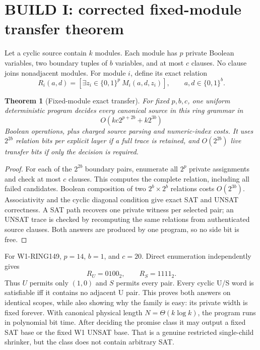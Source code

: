 \documentclass[11pt]{article}
\newtheorem{theorem}{Theorem}
\begin{document}
\section{BUILD I: corrected fixed-module transfer theorem}
Let a cyclic source contain $k$ modules. Each module has $p$ private Boolean
variables, two boundary tuples of $b$ variables, and at most $c$ clauses. No
clause joins nonadjacent modules. For module $i$, define its exact relation
\[
 R_i(a,d)=
 [\exists z_i\in\{0,1\}^p\ M_i(a,d,z_i)],
 \qquad a,d\in\{0,1\}^b.
\]
\begin{theorem}[Fixed-module exact transfer]
For fixed $p,b,c$, one uniform deterministic program decides every canonical
source in this ring grammar in
\[
 O\!\left(kc2^{p+2b}+k2^{3b}\right)
\]
Boolean operations, plus charged source parsing and numeric-index costs. It
uses $2^{2b}$ relation bits per explicit layer if a full trace is retained,
and $O(2^{2b})$ live transfer bits if only the decision is required.
\end{theorem}
\begin{proof}
For each of the $2^{2b}$ boundary pairs, enumerate all $2^p$ private
assignments and check at most $c$ clauses. This computes the complete
relation, including all failed candidates. Boolean composition of two
$2^b\times2^b$ relations costs $O(2^{3b})$. Associativity and the cyclic
diagonal condition give exact SAT and UNSAT correctness. A SAT path recovers
one private witness per selected pair; an UNSAT trace is checked by
recomputing the same relations from authenticated source clauses. Both
answers are produced by one program, so no side bit is free.
\end{proof}

For W1-RING149, $p=14$, $b=1$, and $c=20$. Direct enumeration independently
gives
\[
 R_U=0100_2,\qquad R_S=1111_2.
\]
Thus $U$ permits only $(1,0)$ and $S$ permits every pair. Every cyclic U/S
word is satisfiable iff it contains no adjacent U pair. This proves both
answers on identical scopes, while also showing why the family is easy:
its private width is fixed forever. With canonical physical length
$N=\Theta(k\log k)$, the program runs in polynomial bit time. After deciding
the promise class it may output a fixed SAT base or the fixed W1 UNSAT base.
That is a genuine restricted single-child shrinker, but the class does not
contain arbitrary SAT.
\end{document}
